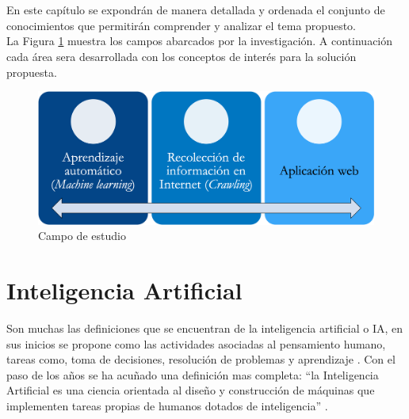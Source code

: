 
\ \\\\
En este capítulo se expondrán de manera detallada y ordenada el conjunto de conocimientos que permitirán comprender y analizar el tema propuesto. \\

La Figura \ref{fig:MarcoT} muestra los campos abarcados por la investigación.
A continuación cada área sera desarrollada con los conceptos de interés para la solución propuesta.

\begin{figure}[H]
	\centering
	\includegraphics[scale=.35]{imagenes/Capitulo3/Marco.png}
	\caption{Campo de estudio}
	\label{fig:MarcoT}
\end{figure}





\section{Inteligencia Artificial}

Son muchas las definiciones que se encuentran de la inteligencia artificial o IA, en sus inicios se propone como las  actividades asociadas al pensamiento humano, tareas como, toma de decisiones, resolución de problemas y aprendizaje \citep{CT19}. Con el paso de los años se ha acuñado una definición mas completa: ``la Inteligencia Artificial es una ciencia orientada al diseño y construcción de máquinas que implementen tareas propias de humanos dotados de inteligencia'' \citep{CT1}.\\


